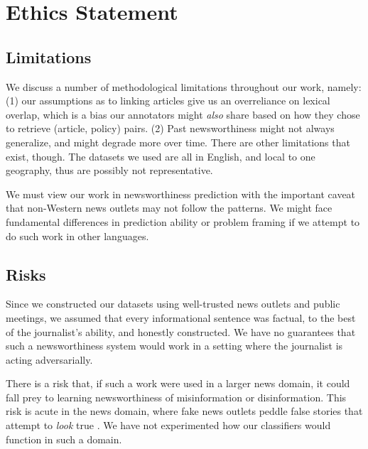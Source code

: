 \documentclass[11pt]{article}
\begin{document}
\section{Ethics Statement}

\subsection{Limitations}

We discuss a number of methodological limitations throughout our work, namely: (1) our assumptions as to linking articles give us an overreliance on lexical overlap, which is a bias our annotators might \textit{also} share based on how they chose to retrieve (article, policy) pairs. (2) Past newsworthiness might not always generalize, and might degrade more over time. There are other limitations that exist, though. The datasets we used are all in English, and local to one geography, thus are possibly not representative.

We must view our work in newsworthiness prediction with the important caveat that non-Western news outlets may not follow the patterns. We might face fundamental differences in prediction ability or problem framing if we attempt to do such work in other languages.

\subsection{Risks}

Since we constructed our datasets using well-trusted news outlets and public meetings, we assumed that every informational sentence was factual, to the best of the journalist's ability, and honestly constructed. We have no guarantees that such a newsworthiness system would work in a setting where the journalist is acting adversarially.

There is a risk that, if such a work were used in a larger news domain, it could fall prey to learning newsworthiness of misinformation or disinformation. This risk is acute in the news domain, where fake news outlets peddle false stories that attempt to \textit{look} true \cite{boyd2018characterizing, spangher2020characterizing, spangher2018analysis}. We have not experimented how our classifiers would function in such a domain. 
\end{document}
